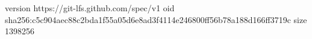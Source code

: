 version https://git-lfs.github.com/spec/v1
oid sha256:c5c904aec88c2bda1f55a05d6e8ad3f4114e246800ff56b78a188d166ff3719c
size 1398256

